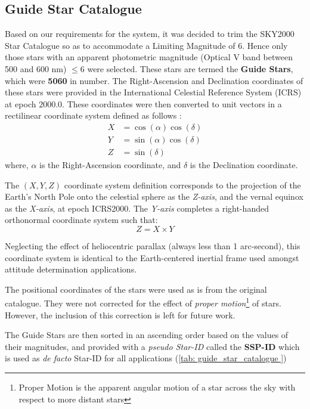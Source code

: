 \documentclass[../../main.tex]{subfiles}
\begin{document}
\subsection{Guide Star Catalogue}

Based on our requirements for the system, it was decided to trim the SKY2000 Star Catalogue so as to accommodate a Limiting Magnitude of $6$. 
Hence only those stars with an apparent photometric magnitude (Optical V band between 500 and 600 nm) $\le 6$ were selected. These stars are termed the \textbf{Guide Stars}, which were \textbf{5060} in number. The Right-Ascension and Declination coordinates of these stars were provided in the International Celestial Reference System (ICRS) at epoch $2000.0$. These coordinates were then converted to unit vectors in a rectilinear coordinate system defined as follows \cite{sande1999skymap}:
\begin{equation}
    \begin{aligned}
    X &= \cos(\alpha) \cos(\delta) \\
    Y &= \sin(\alpha) \cos(\delta) \\
    Z &= \sin(\delta)
    \end{aligned}
\end{equation}
where, $\alpha$ is the Right-Ascension coordinate, and $\delta$ is the Declination coordinate.

The $(X, Y, Z)$ coordinate system definition corresponds to the projection of the Earth’s North Pole onto the celestial sphere as the \textit{Z-axis}, and the vernal equinox as the \textit{X-axis}, at epoch ICRS2000.
The \textit{Y-axis} completes a right-handed orthonormal coordinate system such that:
\begin{equation}
    Z = X \times Y
\end{equation}

Neglecting the effect of heliocentric parallax (always less than 1 arc-second), this coordinate system is identical to the Earth-centered inertial frame used amongst attitude determination applications.


The positional coordinates of the stars were used as is from the original catalogue. They were not corrected for the effect of \textit{proper motion}\footnote{Proper Motion is the apparent angular motion of a star across the sky with respect to more distant stars} of stars. However, the inclusion of this correction is left for future work.

The Guide Stars are then sorted in an ascending order based on the values of their magnitudes, and provided with a \textit{pseudo Star-ID} called the \textbf{SSP-ID} which is used as \textit{de facto} Star-ID for all applications (\ref{tab: guide_star_catalogue })
\end{document}
